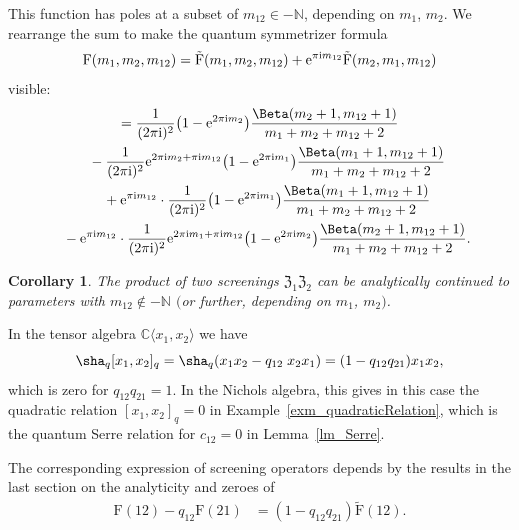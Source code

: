 \documentclass[pdftex]{sigma}%
\numberwithin{equation}{section}
\newtheorem{cor}[teo]{Corollary}
\newcommand{\N}{\mathbb{N}}
\newcommand{\C}{\mathbb{C}}
\renewcommand{\i}{\mathrm{i}}
\newcommand{\zem}{\mathfrak{Z}}
\newcommand{\Fp}{\mathrm{F}}
\newcommand{\rFp}{\tilde{\mathrm{F}}}
\begin{document}
This function has poles at a subset of $m_{12}\in -\N$, depending on $m_1$, $m_2$. We rearrange the sum to make the quantum symmetrizer formula
\[ \Fp(m_1,m_2,m_{12}) =\rFp(m_1,m_2,m_{12})+{\rm e}^{\pi\i m_{12}}  \rFp(m_2,m_1,m_{12})
\] visible:
\begin{gather*}
	 =\frac{1}{(2\pi\i)^2}\big(1-{\rm e}^{2\pi\i m_2}\big)
	 \frac{\Beta(m_2+1,m_{12}+1)}{m_1+m_2+m_{12}+2}\\
	 \quad{} -\frac{1}{(2\pi\i)^2}{\rm e}^{2\pi\i m_2+\pi\i m_{12}}\big(1-{\rm e}^{2\pi\i m_1}\big)
	 \frac{\Beta(m_1+1,m_{12}+1)}{m_1+m_2+m_{12}+2}\\
	 \quad{} +{\rm e}^{\pi\i m_{12}}\cdot \frac{1}{(2\pi\i)^2}\big(1-{\rm e}^{2\pi\i m_1}\big)
	 \frac{\Beta(m_1+1,m_{12}+1)}{m_1+m_2+m_{12}+2}\\
	 \quad{} -{\rm e}^{\pi\i m_{12}}\cdot \frac{1}{(2\pi\i)^2}{\rm e}^{2\pi\i m_1+\pi\i m_{12}}\big(1-{\rm e}^{2\pi\i m_2}\big)
	 \frac{\Beta(m_2+1,m_{12}+1)}{m_1+m_2+m_{12}+2}.
	 \end{gather*}
\begin{cor}\label{cor_product}
	The product of two screenings $\zem_1\zem_2$ can be analytically continued to parameters with $m_{12}\not\in-\N$ $($or further, depending on $m_1$, $m_2)$.
\end{cor}

In the tensor algebra $\C\langle x_1,x_2 \rangle$ we have
\[\sha_q[x_1,x_2]_q=\sha_q(x_1x_2-q_{12}\;x_2x_1)=(1-q_{12}q_{21})x_1x_2,\]
which is zero for $q_{12}q_{21}=1$. In the Nichols algebra, this gives in this case the quadratic relation $[x_1,x_2]_q=0$ in Example~\ref{exm_quadraticRelation}, which is the quantum Serre relation for $c_{12}=0$ in Lemma~\ref{lm_Serre}.

The corresponding expression of screening operators depends by the results in the last section on the analyticity and zeroes of
\begin{align*}
\Fp(12)-q_{12}\Fp(21)
&=(1-q_{12}q_{21})\rFp(12).
\end{align*}
\end{document}

